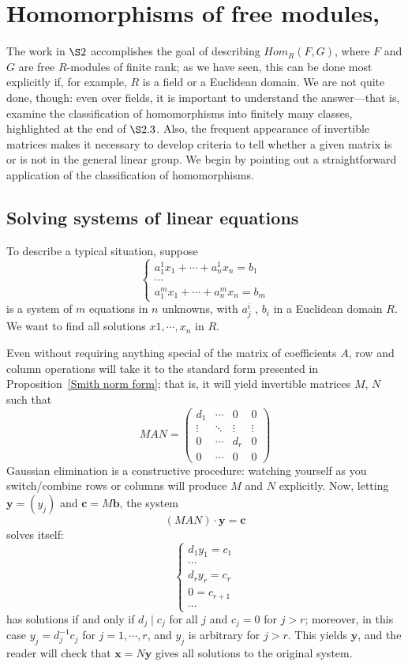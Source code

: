 \section{Homomorphisms of free modules, }
The work in $\S2$ accomplishes the goal of describing $Hom_R(F,G)$, where $F$ and $G$ are free $R$-modules of finite rank; as we have seen, this can be done most explicitly if, for example, $R$ is a field or a Euclidean domain. We are not quite done, though: even over fields, it is important to understand the answer—that is, examine the classification of homomorphisms into finitely many classes, highlighted at the end of $\S2.3$. Also, the frequent appearance of invertible matrices makes it necessary to develop criteria to tell whether a given matrix is or is not in the general linear group. We begin by pointing out a straightforward application of the classification
of homomorphisms.
\subsection{Solving systems of linear equations}
To describe a typical situation, suppose
\[\left\{\begin{array}{c}
a^1_1x_1+\cdots+a^1_nx_n=b_1\\
\cdots\\
a^m_1x_1+\cdots+a^m_nx_n=b_m
\end{array}\right. \]
is a system of $m$ equations in $n$ unknowns, with $a^i_j$ , $b_i$ in a Euclidean domain $R$.
We want to find all solutions $x1,\cdots,x_n$ in $R$.\par
Even without requiring anything special of the matrix of coefficients $A$, row and column operations will take it to the standard form presented in Proposition~\ref{Smith norm form}; that is, it will yield invertible matrices $M$, $N$ such that
\[MAN=\left(\begin{array}{ccc|c}
d_1&\cdots&0&0\\
\vdots&\ddots&\vdots&\vdots\\
0&\cdots&d_r&0\\
\hline
0&\cdots&0&0
\end{array}\right)\]
Gaussian elimination is a constructive procedure: watching yourself as you switch/combine rows or columns will produce $M$ and $N$ explicitly. Now, letting $\bm{y}=(y_j)$ and $\bm{c}=M\bm{b}$, the system
\[(MAN)\cdot\bm{y}=\bm{c}\]
solves itself:
\[\left\{\begin{array}{c}
d_1y_1=c_1\\
\cdots\\
d_ry_r=c_r\\
0=c_{r+1}\\
\cdots
\end{array}\right. \]
has solutions if and only if $d_j\mid c_j$ for all $j$ and $c_j=0$ for $j>r$; moreover, in this
case $y_j=d_j^{-1}c_j$ for $j=1,\cdots,r$, and $y_j$ is arbitrary for $j>r$. This yields $\bm{y}$, and the reader will check that $\bm{x}=N\bm{y}$ gives all solutions to the original system.
